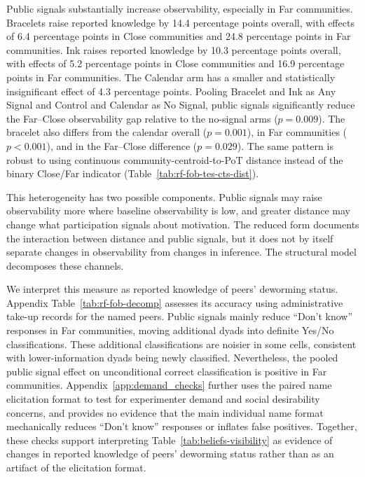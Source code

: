 \documentclass[ECM\space ReStud.tex]{subfiles}
\begin{document}
Public signals substantially increase observability, especially in Far communities. Bracelets raise reported knowledge by 14.4 percentage points overall, with effects of 6.4 percentage points in Close communities and 24.8 percentage points in Far communities. Ink raises reported knowledge by 10.3 percentage points overall, with effects of 5.2 percentage points in Close communities and 16.9 percentage points in Far communities. The Calendar arm has a smaller and statistically insignificant effect of 4.3 percentage points. Pooling Bracelet and Ink as Any Signal and Control and Calendar as No Signal, public signals significantly reduce the Far--Close observability gap relative to the no-signal arms (\(p=0.009\)). The bracelet also differs from the calendar overall (\(p=0.001\)), in Far communities (\(p<0.001\)), and in the Far--Close difference (\(p=0.029\)). The same pattern is robust to using continuous community-centroid-to-PoT distance instead of the binary Close/Far indicator (Table~\ref{tab:rf-fob-tes-cts-dist}).%

This heterogeneity has two possible components. Public signals may raise observability more where baseline observability is low, and greater distance may change what participation signals about motivation. The reduced form documents the interaction between distance and public signals, but it does not by itself separate changes in observability from changes in inference. The structural model decomposes these channels.

We interpret this measure as reported knowledge of peers' deworming status. Appendix Table~\ref{tab:rf-fob-decomp} assesses its accuracy using administrative take-up records for the named peers. Public signals mainly reduce ``Don't know'' responses in Far communities, moving additional dyads into definite Yes/No classifications. These additional classifications are noisier in some cells, consistent with lower-information dyads being newly classified. Nevertheless, the pooled public signal effect on unconditional correct classification is positive in Far communities. Appendix~\ref{app:demand_checks} further uses the paired name elicitation format to test for experimenter demand and social desirability concerns, and provides no evidence that the main individual name format mechanically reduces ``Don't know'' responses or inflates false positives. Together, these checks support interpreting Table~\ref{tab:beliefs-visibility} as evidence of changes in reported knowledge of peers' deworming status rather than as an artifact of the elicitation format.
\end{document}
